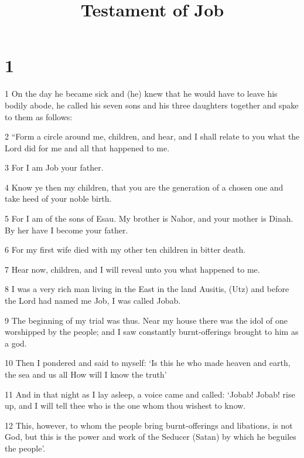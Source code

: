 


\title{Testament of Job}

\chapter{1}

\par 1 On the day he became sick and (he) knew that he would have to leave his bodily abode, he called his seven sons and his three daughters together and spake to them as follows: 

\par 2 “Form a circle around me, children, and hear, and I shall relate to you what the Lord did for me and all that happened to me. 

\par 3 For I am Job your father. 

\par 4 Know ye then my children, that you are the generation of a chosen one and take heed of your noble birth.

\par 5 For I am of the sons of Esau. My brother is Nahor, and your mother is Dinah. By her have I become your father. 

\par 6 For my first wife died with my other ten children in bitter death. 

\par 7 Hear now, children, and I will reveal unto you what happened to me.

\par 8 I was a very rich man living in the East in the land Ausitis, (Utz) and before the Lord had named me Job, I was called Jobab.

\par 9 The beginning of my trial was thus. Near my house there was the idol of one worshipped by the people; and I saw constantly burnt-offerings brought to him as a god.

\par 10 Then I pondered and said to myself: ‘Is this he who made heaven and earth, the sea and us all How will I know the truth’

\par 11 And in that night as I lay asleep, a voice came and called: ‘Jobab! Jobab! rise up, and I will tell thee who is the one whom thou wishest to know. 

\par 12 This, however, to whom the people bring burnt-offerings and libations, is not God, but this is the power and work of the Seducer (Satan) by which he beguiles the people’.

